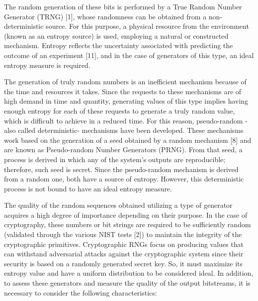 \documentclass[journal]{IEEEtran}
\begin{document}
The random generation of these bits is performed by a True Random Number Generator (TRNG) [1], whose randomness can be obtained from a non-deterministic source. For this purpose, a physical resource from the environment (known as an entropy source) is used, employing a natural or constructed mechanism. Entropy reflects the uncertainty associated with predicting the outcome of an experiment [11], and in the case of generators of this type, an ideal entropy measure is required. 

The generation of truly random numbers is an inefficient mechanism because of the time and resources it takes. Since the requests to these mechanisms are of high demand in time and quantity, generating values of this type implies having enough entropy for each of these requests to generate a truly random value, which is difficult to achieve in a reduced time. For this reason, pseudo-random -also called deterministic- mechanisms have been developed. These mechanisms work based on the generation of a seed obtained by a random mechanism [8] and are known as Pseudo-random Number Generators (PRNG). From that seed, a process is derived in which any of the system’s outputs are reproducible; therefore, such seed is secret. Since the pseudo-random mechanism is derived from a random one, both have a source of entropy. However, this deterministic process is not bound to have an ideal entropy measure.

The quality of the random sequences obtained utilizing a type of generator acquires a high degree of importance depending on their purpose. In the case of cryptography, these numbers or bit strings are required to be sufficiently random (validated through the various NIST tests [2]) to maintain the integrity of the cryptographic primitives. Cryptographic RNGs focus on producing values that can withstand adversarial attacks against the cryptographic system since their security is based on a randomly generated secret key. So, it must maximize its entropy value and have a uniform distribution to be considered ideal. In addition, to assess these generators and measure the quality of the output bitstreams, it is necessary to consider the following characteristics:
\end{document}
